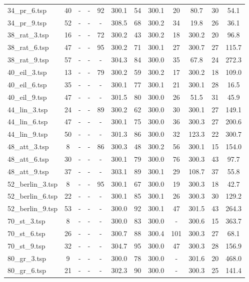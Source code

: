 \begin{table}[H]
\begin{tabular}{|l|c||cc|cc|cc|cc|cc|}
34\_pr\_6.tsp & 40 & - & - & 92 & 300.1 & 54 & 300.1 & 20 & 80.7 & 30 & 54.1 \\
34\_pr\_9.tsp & 52 & - & - & - & 308.5 & 68 & 300.2 & 34 & 19.8 & 26 & 36.1 \\
38\_rat\_3.tsp & 16 & - & - & 72 & 300.2 & 43 & 300.2 & 18 & 300.2 & 20 & 96.8 \\
38\_rat\_6.tsp & 47 & - & - & 95 & 300.2 & 71 & 300.1 & 27 & 300.7 & 27 & 115.7 \\
38\_rat\_9.tsp & 57 & - & - & - & 304.3 & 84 & 300.0 & 35 & 67.8 & 24 & 272.3 \\
40\_eil\_3.tsp & 13 & - & - & 79 & 300.2 & 59 & 300.2 & 17 & 300.2 & 18 & 109.0 \\
40\_eil\_6.tsp & 35 & - & - & - & 300.1 & 77 & 300.1 & 21 & 300.1 & 28 & 16.5 \\
40\_eil\_9.tsp & 47 & - & - & - & 301.5 & 80 & 300.0 & 26 & 51.5 & 31 & 45.9 \\
44\_lin\_3.tsp & 24 & - & - & 89 & 300.2 & 62 & 300.0 & 30 & 300.1 & 27 & 149.1 \\
44\_lin\_6.tsp & 47 & - & - & - & 300.1 & 75 & 300.0 & 36 & 300.3 & 27 & 200.6 \\
44\_lin\_9.tsp & 50 & - & - & - & 301.3 & 86 & 300.0 & 32 & 123.3 & 22 & 300.7 \\
48\_att\_3.tsp & 8 & - & - & 86 & 300.3 & 48 & 300.2 & 56 & 300.1 & 15 & 154.0 \\
48\_att\_6.tsp & 30 & - & - & - & 300.1 & 79 & 300.0 & 76 & 300.3 & 43 & 97.7 \\
48\_att\_9.tsp & 37 & - & - & - & 303.1 & 89 & 300.1 & 29 & 108.7 & 37 & 55.8 \\
52\_berlin\_3.tsp & 8 & - & - & 95 & 300.1 & 67 & 300.0 & 19 & 300.3 & 18 & 42.7 \\
52\_berlin\_6.tsp & 22 & - & - & - & 300.1 & 85 & 300.1 & 26 & 300.3 & 30 & 129.2 \\
52\_berlin\_9.tsp & 53 & - & - & - & 300.0 & 92 & 300.1 & 47 & 301.5 & 43 & 264.3 \\
70\_st\_3.tsp & 8 & - & - & - & 300.0 & 83 & 300.0 & - & 300.6 & 15 & 363.7 \\
70\_st\_6.tsp & 26 & - & - & - & 300.7 & 88 & 300.4 & 101 & 300.3 & 27 & 68.1 \\
70\_st\_9.tsp & 32 & - & - & - & 304.7 & 95 & 300.0 & 47 & 300.3 & 28 & 156.9 \\
80\_gr\_3.tsp & 9 & - & - & - & 300.0 & 78 & 300.0 & - & 301.6 & 20 & 468.0 \\
80\_gr\_6.tsp & 21 & - & - & - & 302.3 & 90 & 300.0 & - & 300.3 & 25 & 141.4 \\

\end{tabular}
\end{table}
